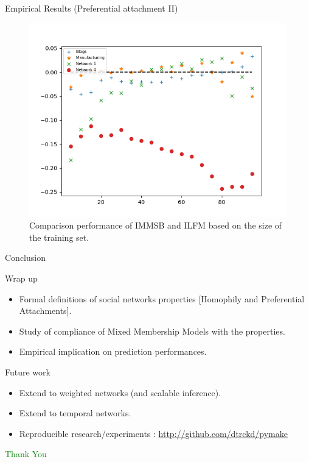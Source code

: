 \begin{frame}[c]{Empirical Results (Preferential attachment II)}
        \begin{figure}[h]
            \caption{Comparison performance of IMMSB and ILFM based on the size of the training set.}
        \includegraphics[scale=0.5]{img/testset_max_20_roc_evolution}
        \end{figure}
\end{frame}



\begin{frame}[c]{Conclusion}
    \begin{block}{Wrap up}
    \begin{itemize}
        \item Formal definitions of social networks properties [Homophily and Preferential Attachments].
        \item Study of compliance of Mixed Membership Models with the properties.
        \item Empirical implication on prediction performances.
    \end{itemize}
    \end{block}

    \begin{block}{Future work}
    \begin{itemize}
        \item Extend to weighted networks (and scalable inference).
        \item Extend to temporal networks. 
        \item Reproducible research/experiments : \hyperlink{http://github.com/dtrckk/pymake}{http://github.com/dtrckd/pymake}

    \end{itemize}
    \end{block}

    \pause
    \vspace{1em}
    \textcolor{green}{Thank You}
\end{frame}

